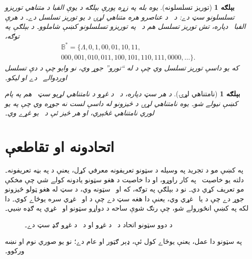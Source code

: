 \documentclass[12pt,a4paper,oneside]{report}
\newcommand{\Setabs}[2]{\{#1 : #2\}}
\newcommand{\Bin}{\mathbb{B}}
\newcommand{\len}[1]{\mathrm{len}(#1)}
\newcommand{\olfileid}[3]{\gdef\pspart{#1}\gdef\pschapter{#2}\gdef\pssection{#3}}
\newcommand{\olsection}[1]{\section{#1}\label{\pspart:\pschapter:\pssection:sec}}
\newcommand{\ollabel}[1]{\label{\pspart:\pschapter:\pssection:#1}}
\newcommand{\olasset}[1]{\centering\begin{LTR}\centering\resizebox{.46\textwidth}{!}{}\end{LTR}}
\newenvironment{explain}{}{}
\newenvironment{tagblock}[1]{}{}
\newtheorem{ex}[defn]{بېلګه}
\begin{document}
\begin{tagblock}{compsci}
\begin{ex}[توريز تسلسلونه]
يوه بله په زړه پورې بېلګه د يوې الفبا  د \emph{متناهي توريزو تسلسلونو} سټ  دے: د~ د عناصرو هره متناهي لړۍ د  يو توريز تسلسل دے۔ د هرې الفبا~ دپاره، \emph{تش توريز تسلسل \LR{$\Lambda$}} هم د~ په توريزو تسلسلونو کښې شاملوو۔ د بېلګې په توګه،
\begin{multline*}
\Bin^*
=\{\Lambda,0,1,00,01,10,11,\\
000,001,010,011,100,101,110,111,0000,\ldots\}.
\end{multline*}
که  يو داسې توريز تسلسل وي چې د  له  ``تورو'' جوړ وي، نو وايو چې د دې تسلسل \emph{اوږدوالے}~ دے او \LR{$\len{x}=n$} ليکو۔
\end{ex}
\end{tagblock}

\begin{ex}[نامتناهي لړۍ]
د هر سټ  دپاره، د~ د غړو د نامتناهي لړيو سټ~ هم په پام کښې نيولے شو۔ يوه نامتناهي لړۍ  د څيزونو له داسې لست نه جوړه وي چې په يو لوري نامتناهي غځېږي، او هر څيز ئې د~ يو غړے وي۔
\end{ex}




\olfileid{sfr}{set}{uni}
\olsection{اتحادونه او تقاطعې}

\begin{explain}
په  کښې مو د تجريد په وسيله د سټونو تعريفونه معرفي کړل، يعنې د \LR{$\Setabs{x}{\phi(x)}$} په بڼه تعريفونه۔ دلته يو خاصيت~\LR{$\phi$} په کار راوړو، او دا خاصيت د هغو سټونو يادونه کولے شي چې مخکې مو تعريف کړي دي۔ نو د بېلګې په توګه، که  او~ سټونه وي، د \LR{$\Setabs{x}{x \in A \lor x \in B}$} سټ له هغو ټولو څيزونو جوړ دے چې د  يا~ غړي وي، يعنې دا هغه سټ دے چې د  او~ غړي سره يوځاے کوي۔ دا لکه په  کښې انځورولے شو، چې رنګ شوې ساحه د دواړو سټونو  او~ غړي په ګډه ښيي۔

\begin{figure}
  \olasset{assets/diagrams/union.tikz}
  \caption{د دوو سټونو اتحاد  د~ د غړو او د~ د غړو ګډ سټ دے۔}
  \ollabel{fig:union}
\end{figure}

په سټونو دا عمل، يعنې يوځاے کول ئې، ډېر ګټور او عام دے؛ نو يو صوري نوم او نښه ورکوو۔
\end{explain}
\end{document}
